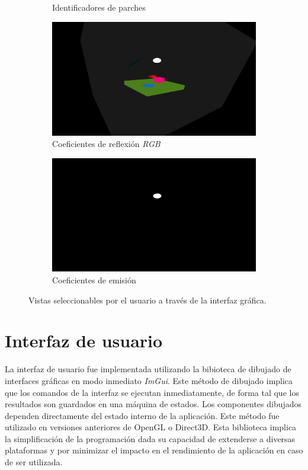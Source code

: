 \begin{figure}[htbp!]
\begin{subfigure}{0.4\textwidth}
		\caption{Identificadores de parches}
	\end{subfigure}
	\begin{subfigure}{0.4\textwidth}
		\includegraphics[width=1\linewidth]{assets/display-view(2)}
		\caption{Coeficientes de reflexión \textit{RGB}}
	\end{subfigure}
	\begin{subfigure}{0.4\textwidth}
		\includegraphics[width=1\linewidth]{assets/display-view(5)}
		\caption{Coeficientes de emisión}
	\end{subfigure}
	\caption{Vistas seleccionables por el usuario a través de la interfaz gráfica.}
	\label{img:displayed}
\end{figure}

\section {Interfaz de usuario}

La interfaz de usuario fue implementada utilizando la bibioteca de dibujado de interfaces gráficas en modo inmediato \textit{ImGui}. Este método de dibujado implica que los comandos de  la interfaz se ejecutan inmediatamente, de forma tal que los resultados son guardados en una máquina de estados. Los componentes dibujados dependen directamente del estado interno de la aplicación. Este método fue utilizado en versiones anteriores de OpenGL o Direct3D. Esta biblioteca implica la simplificación de la programación dada su capacidad de extenderse a diversas plataformas y por minimizar el impacto en el rendimiento de la aplicación en caso de ser utilizada.

